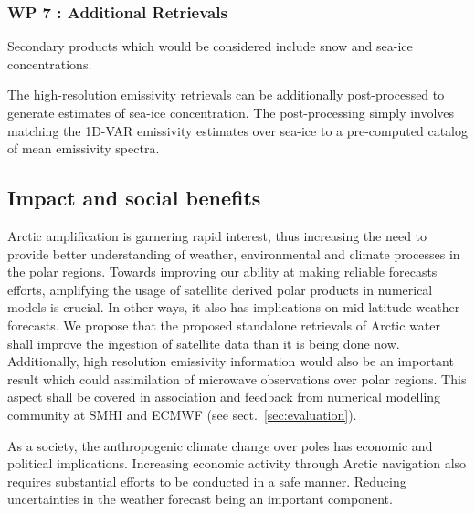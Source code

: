 \documentclass[12pt,oneside,a4paper]{article}
\begin{document}
\subsubsection*{WP 7 : Additional Retrievals}
%
\label{sec:other_retrievals}

Secondary products which would be considered include snow and sea-ice concentrations.  


The high-resolution emissivity retrievals can be additionally post-processed to generate estimates of sea-ice concentration. The post-processing simply involves matching the 1D-VAR emissivity estimates over sea-ice to a pre-computed catalog of mean emissivity spectra. 


\subsection{Impact and social benefits}
%
\label{sec:impact}
Arctic amplification is garnering rapid interest, thus increasing the need to provide better understanding of weather, environmental and climate processes in the polar regions. Towards improving our ability at making reliable forecasts efforts, amplifying the usage of satellite derived polar products in numerical models is crucial. In other ways, it also has implications on mid-latitude weather forecasts. We propose that the proposed standalone retrievals of Arctic water shall improve the ingestion of satellite data than it is being done now. Additionally, high resolution emissivity information would also be an important result which could assimilation of microwave observations over polar regions. This aspect shall be covered in association and feedback from numerical modelling community at SMHI and ECMWF (see sect.~\ref{sec:evaluation}).

As a society, the anthropogenic climate change over poles has economic and political implications. Increasing economic activity through Arctic navigation also requires substantial efforts to be conducted in a safe manner. Reducing uncertainties in the weather forecast being an important component. 

 
\end{document}
